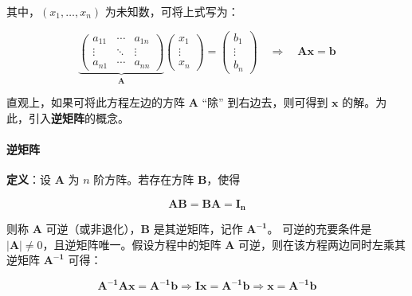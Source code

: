 \begin{flushleft}
	其中，$(x_1, \ldots, x_n)$ 为未知数，可将上式写为：
\end{flushleft}

\vspace{-0.2em}
\begin{equation}
	\underbrace{
		\begin{pmatrix}
			a_{11} & \cdots & a_{1n} \\
			\vdots & \ddots & \vdots \\
			a_{n1} & \cdots & a_{nn}
		\end{pmatrix}
	}_{\mathbf{A}}
	\begin{pmatrix}
		x_1 \\ \vdots \\ x_n
	\end{pmatrix}
	=
	\begin{pmatrix}
		b_1 \\ \vdots \\ b_n
	\end{pmatrix}
	\quad \Rightarrow \quad \mathbf{Ax} = \mathbf{b}
\end{equation}

\begin{flushleft}
	直观上，如果可将此方程左边的方阵 $\mathbf{A}$ ``除'' 到右边去，则可得到 $\mathbf{x}$ 的解。为此，引入\textbf{逆矩阵}的概念。
\end{flushleft}


\paragraph*{逆矩阵}
\begin{flushleft}
	\textbf{定义}：设 $\mathbf{A}$ 为 $n$ 阶方阵。若存在方阵 $\mathbf{B}$，使得  
\end{flushleft}

\vspace{-0.5em}
\begin{equation}
\mathbf{AB} = \mathbf{BA} = \mathbf{I_n}
\end{equation} 

\begin{flushleft}
	则称 $\mathbf{A}$ 可逆（或非退化），$\mathbf{B}$ 是其逆矩阵，记作 $\mathbf{A^{-1}}$。  
	可逆的充要条件是 $|\mathbf{A}| \neq 0$，且逆矩阵唯一。假设方程中的矩阵 $\mathbf{A}$ 可逆，则在该方程两边同时左乘其逆矩阵 $\mathbf{A^{-1}}$ 可得：
\end{flushleft}

\vspace{-0.5em}
\begin{equation}
	\mathbf{A^{-1}}\mathbf{A}\mathbf{x} = \mathbf{A^{-1}}\mathbf{b} \Rightarrow \mathbf{I}\mathbf{x} = \mathbf{A^{-1}}\mathbf{b} \Rightarrow \mathbf{x} = \mathbf{A^{-1}}\mathbf{b}
\end{equation}

